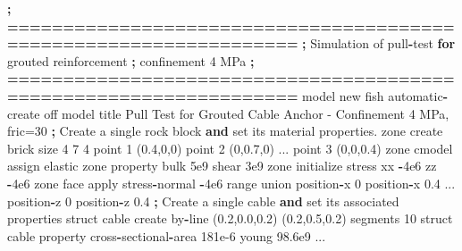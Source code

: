 \documentclass[a4paper, nobind]{templates/ociamthesis}
\newenvironment{Shaded}{\begin{snugshade}}{\end{snugshade}}
\newcommand{\BuiltInTok}[1]{#1}
\newcommand{\ControlFlowTok}[1]{\textcolor[rgb]{0.13,0.29,0.53}{\textbf{#1}}}
\newcommand{\DecValTok}[1]{\textcolor[rgb]{0.00,0.00,0.81}{#1}}
\newcommand{\FloatTok}[1]{\textcolor[rgb]{0.00,0.00,0.81}{#1}}
\newcommand{\KeywordTok}[1]{\textcolor[rgb]{0.13,0.29,0.53}{\textbf{#1}}}
\newcommand{\NormalTok}[1]{#1}
\newcommand{\OperatorTok}[1]{\textcolor[rgb]{0.81,0.36,0.00}{\textbf{#1}}}
\newcommand{\StringTok}[1]{\textcolor[rgb]{0.31,0.60,0.02}{#1}}
\renewenvironment{Shaded}
{
  \vspace{10pt}%
  \begin{snugshade}%
}{%
  \end{snugshade}%
  \vspace{8pt}%
}
\begin{document}
\begin{Shaded}
\begin{Highlighting}[]
    \OperatorTok{;} \OperatorTok{==================================================================}
    \OperatorTok{;}\NormalTok{   Simulation of pull}\OperatorTok{{-}}\NormalTok{test }\ControlFlowTok{for}\NormalTok{ grouted reinforcement}
    \OperatorTok{;}\NormalTok{     confinement }\DecValTok{4}\NormalTok{ MPa}
    \OperatorTok{;} \OperatorTok{==================================================================}
\NormalTok{    model new }
\NormalTok{    fish automatic}\OperatorTok{{-}}\NormalTok{create off}
\NormalTok{    model title }\StringTok{\textquotesingle{}Pull Test for Grouted Cable Anchor {-} Confinement 4 MPa, fric=30\textquotesingle{}}
    \OperatorTok{;}\NormalTok{ Create a single rock block }\KeywordTok{and} \BuiltInTok{set}\NormalTok{ its material properties.}
\NormalTok{    zone create brick size }\DecValTok{4} \DecValTok{7} \DecValTok{4}\NormalTok{ point }\DecValTok{1}\NormalTok{ (}\FloatTok{0.4}\NormalTok{,}\DecValTok{0}\NormalTok{,}\DecValTok{0}\NormalTok{) point }\DecValTok{2}\NormalTok{ (}\DecValTok{0}\NormalTok{,}\FloatTok{0.7}\NormalTok{,}\DecValTok{0}\NormalTok{) ...}
\NormalTok{                                 point }\DecValTok{3}\NormalTok{ (}\DecValTok{0}\NormalTok{,}\DecValTok{0}\NormalTok{,}\FloatTok{0.4}\NormalTok{)}
\NormalTok{    zone cmodel assign elastic}
\NormalTok{    zone }\BuiltInTok{property}\NormalTok{ bulk }\FloatTok{5e9}\NormalTok{ shear }\FloatTok{3e9}
\NormalTok{    zone initialize stress xx }\OperatorTok{{-}}\FloatTok{4e6}\NormalTok{ zz }\OperatorTok{{-}}\FloatTok{4e6}
\NormalTok{    zone face }\BuiltInTok{apply}\NormalTok{ stress}\OperatorTok{{-}}\NormalTok{normal }\OperatorTok{{-}}\FloatTok{4e6} \BuiltInTok{range}\NormalTok{ union position}\OperatorTok{{-}}\NormalTok{x }\DecValTok{0}\NormalTok{ position}\OperatorTok{{-}}\NormalTok{x }\FloatTok{0.4}\NormalTok{ ...}
\NormalTok{                                                   position}\OperatorTok{{-}}\NormalTok{z }\DecValTok{0}\NormalTok{ position}\OperatorTok{{-}}\NormalTok{z }\FloatTok{0.4}
    \OperatorTok{;}\NormalTok{ Create a single cable }\KeywordTok{and} \BuiltInTok{set}\NormalTok{ its associated properties}
\NormalTok{    struct cable create by}\OperatorTok{{-}}\NormalTok{line (}\FloatTok{0.2}\NormalTok{,}\FloatTok{0.0}\NormalTok{,}\FloatTok{0.2}\NormalTok{) (}\FloatTok{0.2}\NormalTok{,}\FloatTok{0.5}\NormalTok{,}\FloatTok{0.2}\NormalTok{) segments }\DecValTok{10}
\NormalTok{    struct cable }\BuiltInTok{property}\NormalTok{ cross}\OperatorTok{{-}}\NormalTok{sectional}\OperatorTok{{-}}\NormalTok{area }\FloatTok{181e{-}6}\NormalTok{ young }\FloatTok{98.6e9}\NormalTok{ ...}

\end{Highlighting}
\end{Shaded}
\end{document}
